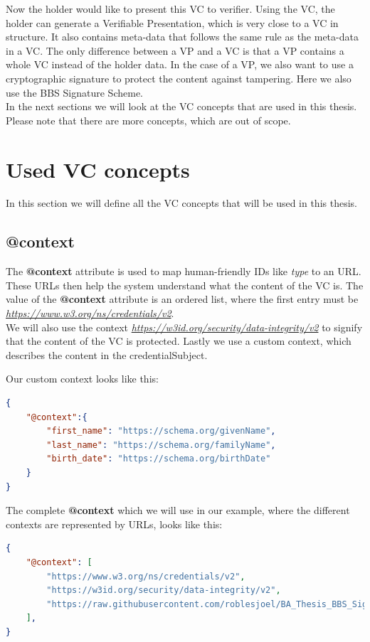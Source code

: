 \documentclass[
	a4paper               %
	,BCOR=0mm            %
	,bibliography=totoc   %
	,listof=totoc         %
	,monolingual
	,twoside=false
]{bfhthesis}              %
\begin{document}
Now the holder would like to present this VC to verifier.
Using the VC, the holder can generate a Verifiable Presentation\cite{verifiable-credentials}, which is very close to a VC in structure.
It also contains meta-data that follows the same rule as the meta-data in a VC.
The only difference between a VP and a VC is that a VP contains a whole VC instead of the holder data.
In the case of a VP, we also want to use a cryptographic signature to protect the content against tampering. Here we also use the BBS Signature Scheme.\\

In the next sections we will look at the VC concepts that are used in this thesis.
Please note that there are more concepts, which are out of scope.

\section{Used VC concepts}
\label{sec:usedvcconcepts}
In this section we will define all the VC concepts that will be used in this thesis.

\subsection{@context}
The \textbf{@context} attribute is used to map human-friendly IDs like \textit{type} to an URL.
These URLs then help the system understand what the content of the VC is.
The value of the \textbf{@context} attribute is an ordered list, where the first entry must be \textit{\url{https://www.w3.org/ns/credentials/v2}}.\\
We will also use the context \textit{\url{https://w3id.org/security/data-integrity/v2}} to signify that the content of the VC is protected.
Lastly we use a custom context, which describes the content in the credentialSubject.

Our custom context looks like this:
\begin{lstlisting}[language=json,firstnumber=1,caption={Example custom context},captionpos=b]
{
    "@context":{
        "first_name": "https://schema.org/givenName",
        "last_name": "https://schema.org/familyName",
		"birth_date": "https://schema.org/birthDate"
    }
}
\end{lstlisting}

The complete \textbf{@context} which we will use in our example, where the different contexts are represented by URLs, looks like this:
\begin{lstlisting}[language=json,firstnumber=1,caption={Example context},captionpos=b]
{
	"@context": [
		"https://www.w3.org/ns/credentials/v2",
		"https://w3id.org/security/data-integrity/v2",
		"https://raw.githubusercontent.com/roblesjoel/BA_Thesis_BBS_Signatures/docs/context/example_1.jsonld"
	],
}
\end{lstlisting}
\end{document}

